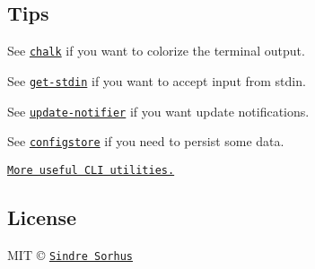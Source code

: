 \subsection*{Tips}

See \href{https://github.com/chalk/chalk}{\tt {\ttfamily chalk}} if you want to colorize the terminal output.

See \href{https://github.com/sindresorhus/get-stdin}{\tt {\ttfamily get-\/stdin}} if you want to accept input from stdin.

See \href{https://github.com/yeoman/update-notifier}{\tt {\ttfamily update-\/notifier}} if you want update notifications.

See \href{https://github.com/yeoman/configstore}{\tt {\ttfamily configstore}} if you need to persist some data.

\href{https://github.com/sindresorhus/awesome-nodejs#command-line-utilities}{\tt More useful C\+LI utilities.}

\subsection*{License}

M\+IT © \href{http://sindresorhus.com}{\tt Sindre Sorhus} 